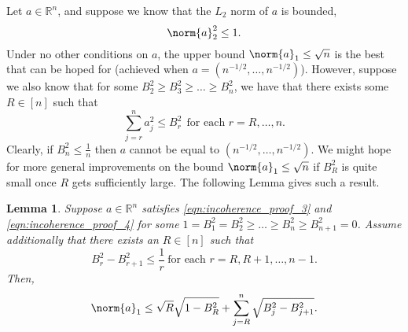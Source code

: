 \documentclass{article}
\newcommand{\Reals}{\mathbb{R}}
\newcommand{\1}{\mathbf{1}}
\theoremstyle{alden}
\theoremstyle{aldenthm}
\newtheorem{lemma}{Lemma}
\theoremstyle{definition}
\theoremstyle{remark}
\begin{document}
Let $a \in \Reals^n$, and suppose we know that the $L_2$ norm of $a$ is bounded,
\begin{equation}
\label{eqn:incoherence_proof_3}
\norm{a}_2^2 \leq 1.
\end{equation}
Under no other conditions on $a$, the upper bound $\norm{a}_1 \leq \sqrt{n}$ is the best that can be hoped for (achieved when $a = (n^{-1/2},\ldots,n^{-1/2})$). However, suppose we also know that for some $B_2^2 \geq B_3^2 \geq \ldots \geq B_n^2$, we have that there exists some $R \in [n]$ such that
\begin{equation}
\label{eqn:incoherence_proof_4}
\sum_{j = r}^{n} a_j^2 \leq B_r^2 ~~\textrm{for each $r = R,\ldots,n$.}
\end{equation}
Clearly, if $B_n^2 \leq \frac{1}{n}$ then $a$ cannot be equal to $(n^{-1/2},\ldots,n^{-1/2})$. We might hope for more general improvements on the bound $\norm{a}_1 \leq \sqrt{n}$ if $B_R^2$ is quite small once $R$ gets sufficiently large. The following Lemma gives such a result.
\begin{lemma}
	\label{lem:incoherence_util_1}
	Suppose $a \in \Reals^n$ satisfies \eqref{eqn:incoherence_proof_3} and \eqref{eqn:incoherence_proof_4} for some $1 = B_1^2 = B_2^2 \geq \ldots \geq B_n^2 \geq B_{n+1}^2 = 0$. Assume additionally that there exists an $R \in [n]$ such that
	\begin{equation}
	\label{eqn:incoherence_util_1}
	B_r^2 - B_{r + 1}^2 \leq \frac{1}{r}~\textrm{for each $r = R, R+1,\ldots, n - 1$.}
	\end{equation}
	Then,
	\begin{equation}
	\label{eqn:incoherence_util_2}
	\norm{a}_1 \leq \sqrt{R}\sqrt{1 - B_R^2} + \sum_{j = R}^{n} \sqrt{B_j^2 - B_{j+1}^2}.
	\end{equation}
\end{lemma}
\end{document}
